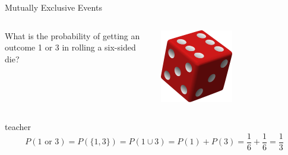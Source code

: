 \begin{frame}{Mutually Exclusive Events}

    \begin{example}
    \medskip
    \begin{columns}
        \begin{column}{0.65\textwidth}
            What is the probability of getting an outcome 1 or 3 in rolling a six-sided die?
        \end{column}
        \begin{column}{0.25\textwidth}
            \includegraphics[width=0.5\textwidth]{gfx/web/die}
        \end{column}
    \end{columns}
    \end{example}
    \medskip
    \begin{shownto}{teacher}
        \pause
        \begin{equation*}
        P(1\text{ or }3) = P(\{1, 3\}) = P(1 \cup 3) = P(1) + P(3) = \frac{1}{6} + \frac{1}{6} = \frac{1}{3}
        \end{equation*}
    \end{shownto}
    

\end{frame}
